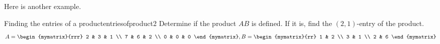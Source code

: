 Here is another example.

\begin{example}{Finding the entries of a product}{entriesofproduct2}
Determine if the product $AB$ is defined. If it is, find the $\left( 2, 1 \right)$-entry of the product.
\begin{equation*}
A=
\begin{mymatrix}{rrr}
2 & 3 & 1 \\
7 & 6 & 2 \\
0 & 0 & 0
\end{mymatrix},  B =\begin{mymatrix}{rr}
1 & 2 \\
3 & 1 \\
2 & 6
\end{mymatrix} 
\end{equation*}
\end{example}

